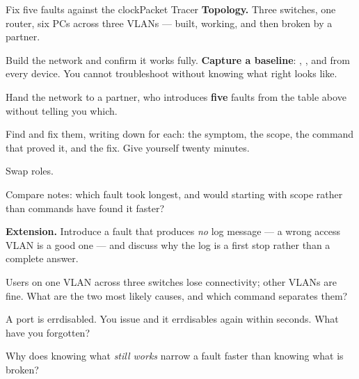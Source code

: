 \begin{lab}{Fix five faults against the clock}{Packet Tracer}
\textbf{Topology.} Three switches, one router, six PCs across three VLANs ---
built, working, and then broken by a partner.

\begin{tasks}
  \item Build the network and confirm it works fully. \textbf{Capture a baseline}:
        , ,
         and  from every
        device. You cannot troubleshoot without knowing what right looks like.
  \item Hand the network to a partner, who introduces \textbf{five} faults from
        the table above without telling you which.
  \item Find and fix them, writing down for each: the symptom, the scope, the
        command that proved it, and the fix. Give yourself twenty minutes.
  \item Swap roles.
  \item Compare notes: which fault took longest, and would starting with scope
        rather than commands have found it faster?
  \item \textbf{Extension.} Introduce a fault that produces \emph{no} log message
        --- a wrong access VLAN is a good one --- and discuss why the log is a
        first stop rather than a complete answer.
\end{tasks}
\end{lab}

\begin{checkpoint}
\begin{tightnum}
  \item Users on one VLAN across three switches lose connectivity; other VLANs are
        fine. What are the two most likely causes, and which command separates
        them?
  \item A port is errdisabled. You issue  and it errdisables
        again within seconds. What have you forgotten?
  \item Why does knowing what \emph{still works} narrow a fault faster than
        knowing what is broken?
\end{tightnum}
\end{checkpoint}

